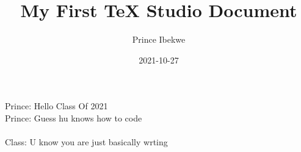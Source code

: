 \documentclass{article}
\title{My First TeX Studio Document}
\date{2021-10-27}
\author{ Prince Ibekwe}
\begin{document}
	\maketitle
	\newpage
	Prince: Hello Class Of 2021\\
	Prince: Guess hu knows how to code\\ \\
	Class: U know you are just basically wrting
\end{document}
